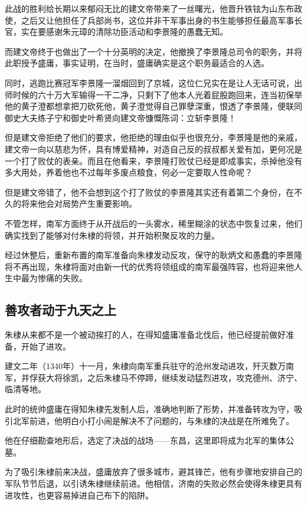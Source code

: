 \begin{multicols}{\theparacolNo}
		此战的胜利给长期以来郁闷无比的建文帝带来了一丝曙光，他晋升铁铉为山东布政使，之后又让他担任了兵部尚书，这位并非干军事出身的书生能够担任最高军事长官，实在要感谢朱元璋的清除功臣活动和李景隆的愚蠢无知。

		而建文帝终于也做出了一个十分英明的决定，他撤换了李景隆总司令的职务，并将此职授予盛庸，事实证明，在当时，盛庸确实是这个职务最适合的人选。

		同时，逃跑比赛冠军李景隆一溜烟回到了京城，这位仁兄实在是让人无话可说，出师时候的六十万大军输得一干二净，只剩下了他本人光着屁股跑回来，连当初保举他的黄子澄都想拿把刀砍死他，黄子澄觉得自己罪孽深重，恨透了李景隆，便联同御史大夫练子宁和御史叶希贤向建文帝慷慨陈词：立斩李景隆！

		但是建文帝拒绝了他们的要求，他拒绝的理由似乎也很充分，李景隆是他的亲戚，建文帝一向以慈悲为怀，具有博爱精神，对造自己反的叔叔都关爱有加，更何况是一个打了败仗的表亲。而且在他看来，李景隆打败仗已经是即成事实，杀掉他没有多大用处，养着他也不过每年多废点粮食，何必一定要取人性命呢？

		但是建文帝错了，他不会想到这个打了败仗的李景隆其实还有着第二个身份，在不久的将来他会对局势产生重要影响。

		不管怎样，南军方面终于从开战后的一头雾水，稀里糊涂的状态中恢复过来，他们确实找到了能够对付朱棣的将领，并开始积聚反攻的力量。

		经过休整后，重新布置的南军准备向朱棣发动反攻，保守的耿炳文和愚蠢的李景隆将不再出现，朱棣将面对由新一代的优秀将领组成的南军最强阵容，也将迎来他人生中最为惨痛的失败。

		\subsection{善攻者动于九天之上}
		朱棣从来都不是一个被动挨打的人，在得知盛庸准备北伐后，他已经提前做好准备，开始了进攻。

		建文二年（1340年）十一月，朱棣向南军重兵驻守的沧州发动进攻，歼灭数万南军，并俘获大将徐凯，之后朱棣马不停蹄，继续发动猛烈进攻，攻克德州、济宁、临清等地。

		此时的统帅盛庸在得知朱棣先发制人后，准确地判断了形势，并准备转攻为守，吸引北军前进，他明白小打小闹是解决不了问题的，与朱棣的决战是在所难免了。

		他在仔细勘查地形后，选定了决战的战场——东昌，这里即将成为北军的集体公墓。

		为了吸引朱棣前来决战，盛庸放弃了很多城市，避其锋芒，他有步骤地安排自己的军队节节后退，以引诱朱棣继续前进。他相信，济南的失败必然会使得朱棣更具有进攻性，也更容易掉进自己布下的陷阱。


\end{multicols}
